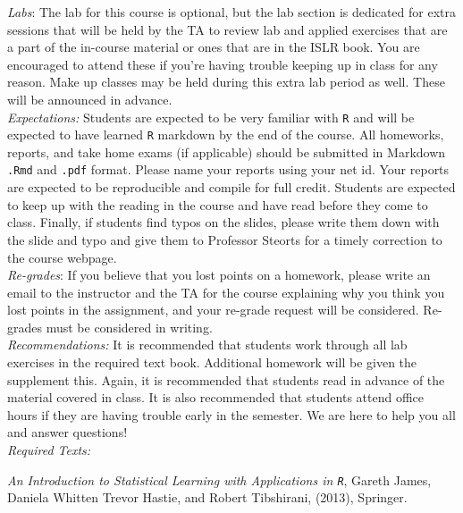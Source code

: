 \documentclass[11pt]{article}
\begin{document}
\emph{Labs}: The lab for this course is optional, but the lab section is dedicated for extra sessions that will be held by the TA to review lab and applied exercises that are a part of the in-course material or ones that are in the ISLR book. You are encouraged to attend these if you're having trouble keeping up in class for any reason. Make up classes may be held during this extra lab period as well. These will be announced in advance. \\


\emph{Expectations:} Students are expected to be very familiar with \texttt{R} and will be expected to have learned \texttt{R} markdown by the end of the course. All homeworks, reports, and take home exams (if applicable) should be submitted in Markdown \texttt{.Rmd} and \texttt{.pdf} format. Please name your reports using your net id. Your reports are expected to be reproducible and compile for full credit.  Students are expected to keep up with the reading in the course and have read before they come to class. Finally, if students find typos on the slides, please write them down with the slide and typo and give them to Professor Steorts for a timely correction to the course webpage.  \\

\emph{Re-grades}: If you believe that you lost points on a homework, please write an email to the instructor and the TA for the course explaining why you think you lost points in the assignment, and your re-grade request will be considered. Re-grades must be considered in writing. \\

\emph{Recommendations:} It is recommended that students work through all lab exercises in the required text book. Additional homework will be given the supplement this. Again, it is recommended that students read in advance of the material covered in class. It is also recommended that students attend office hours if they are having trouble early in the semester. We are here to help you all and answer questions! \\


\emph{Required Texts:} 

\emph{An Introduction to Statistical Learning with Applications in \texttt{R}}, Gareth James, Daniela Whitten Trevor Hastie, and Robert Tibshirani, (2013), Springer.\\
\end{document}

